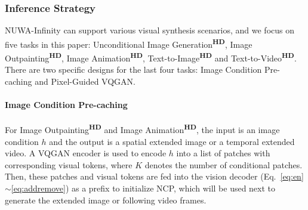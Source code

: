 \documentclass{article}
\begin{document}


\subsubsection{Inference Strategy}\label{sec:is}
\vspace{-3mm}
NUWA-Infinity can support various visual synthesis scenarios, and we focus on five tasks in this paper: Unconditional Image Generation\textsuperscript{\textbf{HD}}, Image Outpainting\textsuperscript{\textbf{HD}}, Image Animation\textsuperscript{\textbf{HD}}, Text-to-Image\textsuperscript{\textbf{HD}} and Text-to-Video\textsuperscript{\textbf{HD}}. There are two specific designs for the last four tasks: Image Condition Pre-caching and Pixel-Guided VQGAN.


\paragraph{Image Condition Pre-caching}
\vspace{-3mm}
For Image Outpainting\textsuperscript{\textbf{HD}} and Image Animation\textsuperscript{\textbf{HD}}, the input is an image condition $h$
and the output is a spatial extended image or a temporal extended video. 
A VQGAN encoder is used to encode $h$ into a list of patches with corresponding visual tokens, where $K$ denotes the number of conditional patches. Then, these patches and visual tokens are fed into the vision decoder (Eq.~\ref{eq:en}$\sim$\ref{eq:addremove}) as a prefix to initialize NCP, which will be used next to generate the extended image or following video frames.
\end{document}
